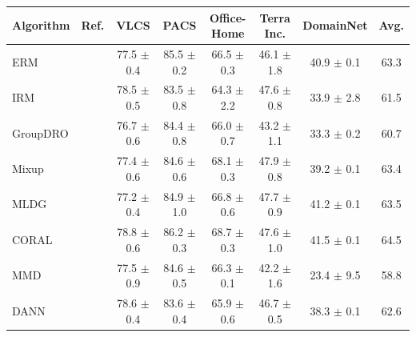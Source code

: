 \begin{table}[t]
\footnotesize
\centering
\begin{tabular}{llcccccc}
\toprule
\textbf{Algorithm}  & \textbf{Ref.}       & \textbf{VLCS}             & \textbf{PACS}             & \textbf{Office-Home}       & \textbf{Terra Inc.}   & \textbf{DomainNet}        & \textbf{Avg.}              \\
\midrule
ERM                       & \citep{vapnik1998statistical}            & 77.5 $\pm$ 0.4            & 85.5 $\pm$ 0.2            & 66.5 $\pm$ 0.3            & 46.1 $\pm$ 1.8            & 40.9 $\pm$ 0.1            & 63.3                     \\
IRM                       & \citep{arjovsky2019invariant}             & 78.5 $\pm$ 0.5            & 83.5 $\pm$ 0.8            & 64.3 $\pm$ 2.2            & 47.6 $\pm$ 0.8            & 33.9 $\pm$ 2.8            & 61.5                      \\
GroupDRO                  & \citep{sagawa2019distributionally}        & 76.7 $\pm$ 0.6            & 84.4 $\pm$ 0.8            & 66.0 $\pm$ 0.7            & 43.2 $\pm$ 1.1            & 33.3 $\pm$ 0.2            & 60.7                      \\
Mixup                     & \citep{yan2020improve}            & 77.4 $\pm$ 0.6            & 84.6 $\pm$ 0.6            & 68.1 $\pm$ 0.3            & 47.9 $\pm$ 0.8            & 39.2 $\pm$ 0.1            & 63.4                      \\
MLDG                      & \citep{LiYSH18}            & 77.2 $\pm$ 0.4            & 84.9 $\pm$ 1.0            & 66.8 $\pm$ 0.6            & 47.7 $\pm$ 0.9            & 41.2 $\pm$ 0.1            & 63.5                      \\
CORAL                     &  \citep{SunS16}             & 78.8 $\pm$ 0.6            & 86.2 $\pm$ 0.3            & 68.7 $\pm$ 0.3            & 47.6 $\pm$ 1.0            & 41.5 $\pm$ 0.1            & 64.5                      \\
MMD                       & \citep{LiPWK18}           & 77.5 $\pm$ 0.9            & 84.6 $\pm$ 0.5            & 66.3 $\pm$ 0.1            & 42.2 $\pm$ 1.6            & 23.4 $\pm$ 9.5            & 58.8                      \\
DANN                      & \citep{GaninUAGLLML16}         & 78.6 $\pm$ 0.4            & 83.6 $\pm$ 0.4            & 65.9 $\pm$ 0.6            & 46.7 $\pm$ 0.5            & 38.3 $\pm$ 0.1            & 62.6                      \\

\end{tabular}
\end{table}
